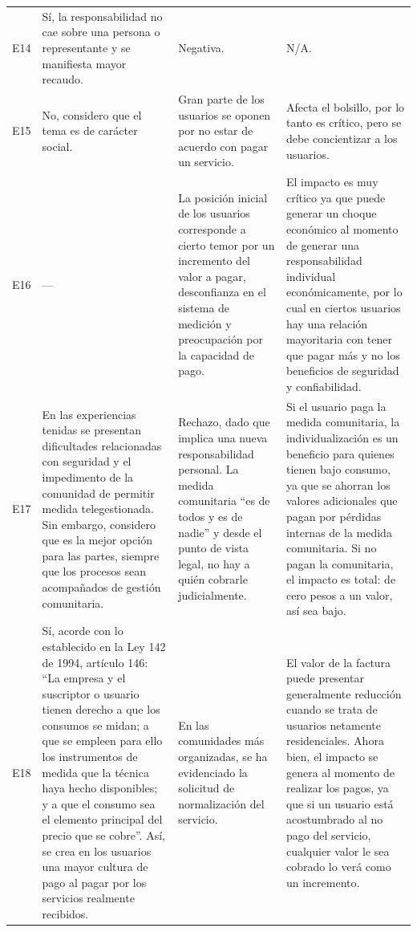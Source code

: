 \begin{longtable}{>{\centering}p{0.7cm}
                  >{\RaggedRight}p{4.5cm}
                  >{\RaggedRight}p{4.5cm}
                  >{\RaggedRight\arraybackslash}p{4.5cm}}
\rowcolor{grisclaro}
E14 & Sí, la responsabilidad no cae sobre una persona o representante y se manifiesta mayor recaudo. & Negativa. & N/A. \\
E15 & No, considero que el tema es de carácter social. & Gran parte de los usuarios se oponen por no estar de acuerdo con pagar un servicio. & Afecta el bolsillo, por lo tanto es crítico, pero se debe concientizar a los usuarios. \\
\rowcolor{grisclaro}
E16 & --- & La posición inicial de los usuarios corresponde a cierto temor por un incremento del valor a pagar, desconfianza en el sistema de medición y preocupación por la capacidad de pago. & El impacto es muy crítico ya que puede generar un choque económico al momento de generar una responsabilidad individual económicamente, por lo cual en ciertos usuarios hay una relación mayoritaria con tener que pagar más y no los beneficios de seguridad y confiabilidad. \\
E17 & En las experiencias tenidas se presentan dificultades relacionadas con seguridad y el impedimento de la comunidad de permitir medida telegestionada. Sin embargo, considero que es la mejor opción para las partes, siempre que los procesos sean acompañados de gestión comunitaria. & Rechazo, dado que implica una nueva responsabilidad personal. La medida comunitaria ``es de todos y es de nadie'' y desde el punto de vista legal, no hay a quién cobrarle judicialmente. & Si el usuario paga la medida comunitaria, la individualización es un beneficio para quienes tienen bajo consumo, ya que se ahorran los valores adicionales que pagan por pérdidas internas de la medida comunitaria. Si no pagan la comunitaria, el impacto es total: de cero pesos a un valor, así sea bajo. \\
\rowcolor{grisclaro}
E18 & Sí, acorde con lo establecido en la Ley 142 de 1994, artículo 146: ``La empresa y el suscriptor o usuario tienen derecho a que los consumos se midan; a que se empleen para ello los instrumentos de medida que la técnica haya hecho disponibles; y a que el consumo sea el elemento principal del precio que se cobre''. Así, se crea en los usuarios una mayor cultura de pago al pagar por los servicios realmente recibidos. & En las comunidades más organizadas, se ha evidenciado la solicitud de normalización del servicio. & El valor de la factura puede presentar generalmente reducción cuando se trata de usuarios netamente residenciales. Ahora bien, el impacto se genera al momento de realizar los pagos, ya que si un usuario está acostumbrado al no pago del servicio, cualquier valor le sea cobrado lo verá como un incremento. \\

\end{longtable}
